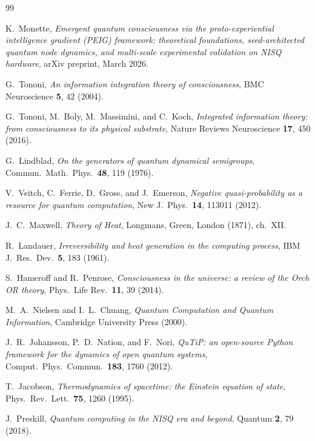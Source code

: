 \documentclass[12pt]{article}
\begin{document}
\begin{thebibliography}{99}

K.~Monette,
\textit{Emergent quantum consciousness via the proto-experiential intelligence
gradient (PEIG) framework: theoretical foundations, seed-architected quantum
node dynamics, and multi-scale experimental validation on NISQ hardware},
arXiv preprint, March 2026.

G.~Tononi,
\textit{An information integration theory of consciousness},
BMC Neuroscience \textbf{5}, 42 (2004).

G.~Tononi, M.~Boly, M.~Massimini, and C.~Koch,
\textit{Integrated information theory: from consciousness to its physical
substrate},
Nature Reviews Neuroscience \textbf{17}, 450 (2016).

G.~Lindblad,
\textit{On the generators of quantum dynamical semigroups},
Commun.\ Math.\ Phys.\ \textbf{48}, 119 (1976).

V.~Veitch, C.~Ferrie, D.~Gross, and J.~Emerson,
\textit{Negative quasi-probability as a resource for quantum computation},
New J.\ Phys.\ \textbf{14}, 113011 (2012).

J.~C.~Maxwell,
\textit{Theory of Heat},
Longmans, Green, London (1871), ch.~XII.

R.~Landauer,
\textit{Irreversibility and heat generation in the computing process},
IBM J.\ Res.\ Dev.\ \textbf{5}, 183 (1961).

S.~Hameroff and R.~Penrose,
\textit{Consciousness in the universe: a review of the Orch OR theory},
Phys.\ Life Rev.\ \textbf{11}, 39 (2014).

M.~A.~Nielsen and I.~L.~Chuang,
\textit{Quantum Computation and Quantum Information},
Cambridge University Press (2000).

J.~R.~Johansson, P.~D.~Nation, and F.~Nori,
\textit{QuTiP: an open-source Python framework for the dynamics of open
quantum systems},
Comput.\ Phys.\ Commun.\ \textbf{183}, 1760 (2012).

T.~Jacobson,
\textit{Thermodynamics of spacetime: the Einstein equation of state},
Phys.\ Rev.\ Lett.\ \textbf{75}, 1260 (1995).

J.~Preskill,
\textit{Quantum computing in the NISQ era and beyond},
Quantum \textbf{2}, 79 (2018).

\end{thebibliography}
\end{document}
